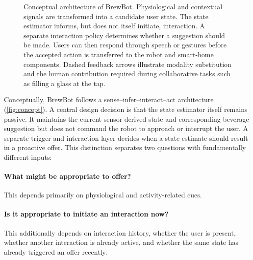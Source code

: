 \begin{figure}[t]
\caption{Conceptual architecture of BrewBot. Physiological and contextual
signals are transformed into a candidate user state. The state estimator
informs, but does not itself initiate, interaction. A separate interaction
policy determines whether a suggestion should be made. Users can then respond
through speech or gestures before the accepted action is transferred to the
robot and smart-home components. Dashed feedback arrows illustrate modality
substitution and the human contribution required during collaborative tasks such
as filling a glass at the tap.}
\label{fig:concept}
\end{figure}

Conceptually, BrewBot follows a sense--infer--interact--act architecture
(\autoref{fig:concept}). A central design decision is that the state estimator
itself remains passive. It maintains the current sensor-derived state and
corresponding beverage suggestion but does not command the robot to approach or
interrupt the user. A separate trigger and interaction layer decides when a
state estimate should result in a proactive offer. This distinction separates
two questions with fundamentally different inputs:

\paragraph{What might be appropriate to offer?}
This depends primarily on physiological and activity-related cues.

\paragraph{Is it appropriate to initiate an interaction now?}
This additionally depends on interaction history, whether the user is present,
whether another interaction is already active, and whether the same state has
already triggered an offer recently.

